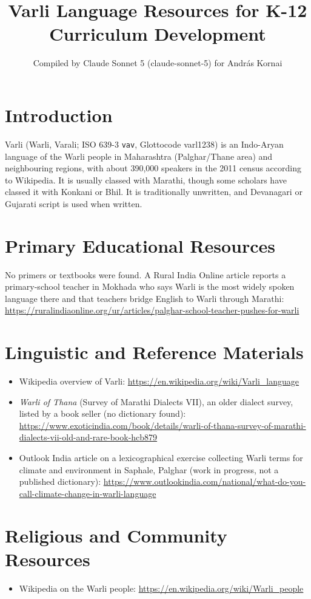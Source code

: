 \documentclass[12pt]{article}
\title{Varli Language Resources for K-12 Curriculum Development}
\author{Compiled by Claude Sonnet 5 (claude-sonnet-5) for Andr\'as Kornai}
\date{}
\begin{document}
\maketitle

\section{Introduction}
Varli (Warli, Varali; ISO 639-3 \texttt{vav}, Glottocode varl1238) is an Indo-Aryan language of the Warli people in Maharashtra (Palghar/Thane area) and neighbouring regions, with about 390,000 speakers in the 2011 census according to Wikipedia. It is usually classed with Marathi, though some scholars have classed it with Konkani or Bhil. It is traditionally unwritten, and Devanagari or Gujarati script is used when written.

\section{Primary Educational Resources}
No primers or textbooks were found. A Rural India Online article reports a primary-school teacher in Mokhada who says Warli is the most widely spoken language there and that teachers bridge English to Warli through Marathi: \url{https://ruralindiaonline.org/ur/articles/palghar-school-teacher-pushes-for-warli}

\section{Linguistic and Reference Materials}
\begin{itemize}
\item Wikipedia overview of Varli: \url{https://en.wikipedia.org/wiki/Varli_language}
\item \emph{Warli of Thana} (Survey of Marathi Dialects VII), an older dialect survey, listed by a book seller (no dictionary found): \url{https://www.exoticindia.com/book/details/warli-of-thana-survey-of-marathi-dialects-vii-old-and-rare-book-hcb879}
\item Outlook India article on a lexicographical exercise collecting Warli terms for climate and environment in Saphale, Palghar (work in progress, not a published dictionary): \url{https://www.outlookindia.com/national/what-do-you-call-climate-change-in-warli-language}
\end{itemize}

\section{Religious and Community Resources}
\begin{itemize}
\item Wikipedia on the Warli people: \url{https://en.wikipedia.org/wiki/Warli_people}
\end{itemize}
\end{document}

